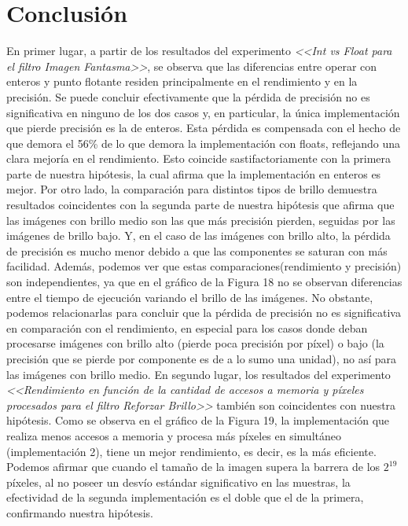 \documentclass[a4paper]{article}
\begin{document}
\section{Conclusión}
\justify
En primer lugar, a partir de los resultados del experimento \textit{<<Int vs Float para el filtro Imagen Fantasma>>}, se observa que las diferencias  entre operar con enteros y punto flotante residen principalmente en el rendimiento y en la precisión. Se puede concluir efectivamente que la pérdida de precisión no es significativa en ninguno de los dos casos y, en particular, la única implementación que pierde precisión es la de enteros. Esta pérdida es compensada con el hecho de que demora el 56\% de lo que demora la implementación con floats, reflejando una clara mejoría en el rendimiento. Esto coincide sastifactoriamente con la primera parte de nuestra hipótesis, la cual afirma que la implementación en enteros es mejor.
\justify
Por otro lado, la comparación para distintos tipos de brillo demuestra resultados coincidentes con la segunda parte de nuestra hipótesis que afirma que las imágenes con brillo medio son las que más precisión pierden, seguidas por las imágenes de brillo bajo. Y, en el caso de las imágenes con brillo alto, la pérdida de precisión es mucho menor debido a que las componentes se saturan con más facilidad. Además, podemos ver que estas comparaciones(rendimiento y precisión) son independientes, ya que en el gráfico de la Figura 18 no se observan diferencias entre el tiempo de ejecución variando el brillo de las imágenes. No obstante, podemos relacionarlas para concluir que la pérdida de precisión no es significativa en comparación con el rendimiento, en especial para los casos donde deban procesarse imágenes con brillo alto (pierde poca precisión por píxel) o bajo (la precisión que se pierde por componente es de a lo sumo una unidad), no así para las imágenes con brillo medio. 
\justify
En segundo lugar, los resultados del experimento \textit{<<Rendimiento en función de la cantidad de accesos a memoria y píxeles procesados para el filtro Reforzar Brillo>>} también son coincidentes con nuestra hipótesis. Como se observa en el gráfico de la Figura 19, la implementación que realiza menos accesos a memoria y procesa más píxeles en simultáneo (implementación 2), tiene un mejor rendimiento, es decir, es la más eficiente. Podemos afirmar que cuando el tamaño de la imagen supera la barrera de los $2^{19}$ píxeles, al no poseer un desvío estándar significativo en las muestras, la efectividad de la segunda implementación es el doble que el de la primera, confirmando nuestra hipótesis. 
\end{document}
